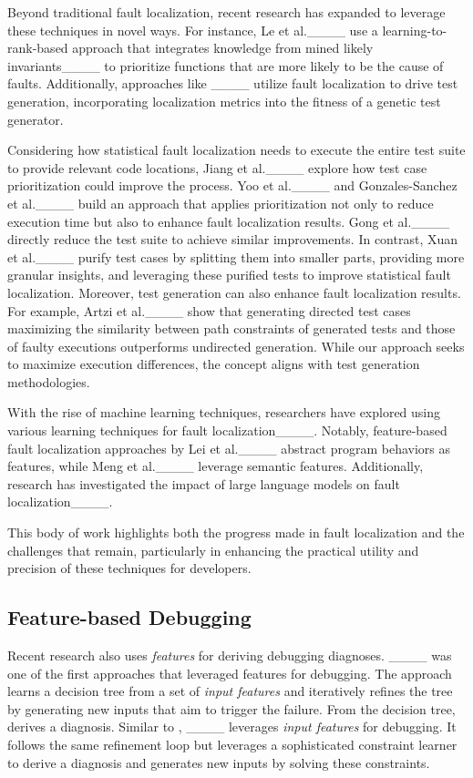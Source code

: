 Beyond traditional fault localization, recent research has expanded to leverage these techniques in novel ways.
For instance, Le et al.____ use a learning-to-rank-based approach that integrates knowledge from mined likely invariants____ to prioritize functions that are more likely to be the cause of faults.
Additionally, approaches like \ENTBUG{}____ utilize fault localization to drive test generation, incorporating localization metrics into the fitness of a genetic test generator.

Considering how statistical fault localization needs to execute the entire test suite to provide relevant code locations, Jiang et al.____ explore how test case prioritization could improve the process.
Yoo et al.____ and Gonzales-Sanchez et al.____ build an approach that applies prioritization not only to reduce execution time but also to enhance fault localization results.
Gong et al.____ directly reduce the test suite to achieve similar improvements.
In contrast, Xuan et al.____ purify test cases by splitting them into smaller parts, providing more granular insights, and leveraging these purified tests to improve statistical fault localization.
Moreover, test generation can also enhance fault localization results.
For example, Artzi et al.____ show that generating directed test cases maximizing the similarity between path constraints of generated tests and those of faulty executions outperforms undirected generation.
While our approach seeks to maximize execution differences, the concept aligns with test generation methodologies.

With the rise of machine learning techniques, researchers have explored using various learning techniques for fault localization____.
Notably, feature-based fault localization approaches by Lei et al.____ abstract program behaviors as features, while Meng et al.____ leverage semantic features.
Additionally, research has investigated the impact of large language models on fault localization____.

This body of work highlights both the progress made in fault localization and the challenges that remain, particularly in enhancing the practical utility and precision of these techniques for developers.


\subsection{Feature-based Debugging}%
\label{sub:related-execution-features}

Recent research also uses \emph{features} for deriving debugging diagnoses.
\ALHAZEN{}____ was one of the first approaches that leveraged features for debugging.
The approach learns a decision tree from a set of \emph{input features} and iteratively refines the tree by generating new inputs that aim to trigger the failure.
From the decision tree, \ALHAZEN{} derives a diagnosis.
Similar to \ALHAZEN{}, \AVICENNA{}____ leverages \emph{input features} for debugging.
It follows the same refinement loop but leverages a sophisticated constraint learner to derive a diagnosis and generates new inputs by solving these constraints.

